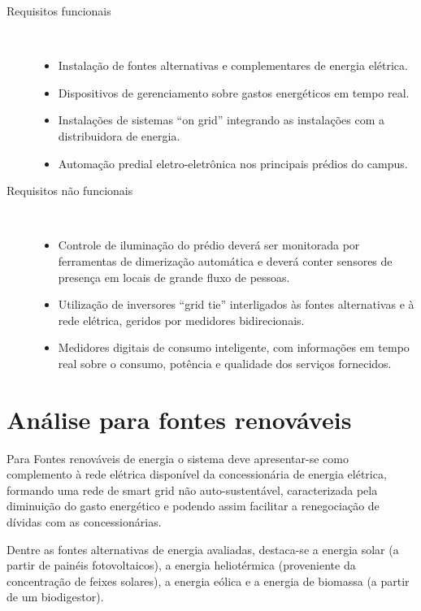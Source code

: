 \begin{description}
	\item [Requisitos funcionais] \

	\begin{itemize}
	\item Instalação de fontes alternativas e complementares de energia elétrica.
	\item Dispositivos de gerenciamento sobre gastos energéticos em tempo real.
	\item Instalações de sistemas “on grid” integrando as instalações com a distribuidora de energia.
	\item Automação predial eletro-eletrônica nos principais prédios do campus.
	\end{itemize}

	\item[Requisitos não funcionais] \
	
	\begin{itemize}
	\item Controle de iluminação do prédio deverá ser monitorada por ferramentas de dimerização automática e deverá conter sensores de presença em locais de grande fluxo de pessoas.
	\item Utilização de inversores “grid tie” interligados às fontes alternativas e à rede elétrica, geridos por medidores bidirecionais.
	\item Medidores digitais de consumo inteligente, com informações em tempo real sobre o consumo, potência e qualidade dos serviços fornecidos.
	\end{itemize}
\end{description}

\section{Análise para fontes renováveis}
Para Fontes renováveis de energia o sistema deve apresentar-se como complemento à rede elétrica disponível da concessionária de energia elétrica, formando uma rede de smart grid não auto-sustentável, caracterizada pela diminuição do gasto energético e podendo assim facilitar a renegociação de dívidas com as concessionárias.

Dentre as fontes alternativas de energia avaliadas, destaca-se a energia solar (a partir de painéis fotovoltaicos), a energia heliotérmica (proveniente da concentração de feixes solares), a energia eólica e a energia de biomassa (a partir de um biodigestor). 

